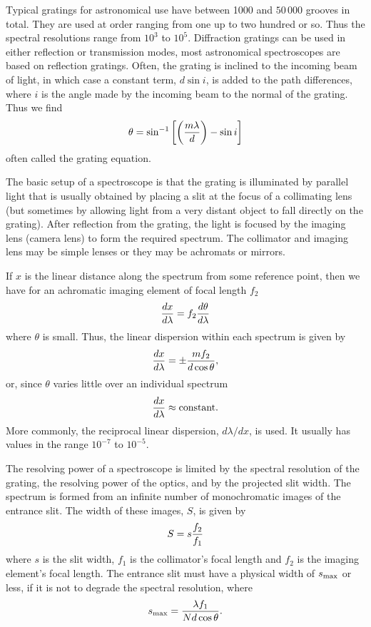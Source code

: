 Typical gratings for astronomical use have between 1000 and $50\,000$ grooves in total.
They are used at order ranging from one up to two hundred or so. Thus the spectral 
resolutions range from $10^3$ to $10^5$. Diffraction gratings can be used in either 
reflection or transmission modes, most astronomical spectroscopes are based on reflection gratings. Often, the grating is inclined to the incoming beam of light, in which
case a constant term, $d\sin i$, is added to the path differences, where $i$ is the angle
made by the incoming beam to the normal of the grating. Thus we find
\[
\theta=\sin^{-1}\left[\left({m\lambda\over d}\right)-\sin i\right]
\]
often called the grating equation.

The basic setup of a spectroscope is that the grating is illuminated by parallel light
that is usually obtained by placing a slit at the focus of a collimating lens (but sometimes by allowing light from a very distant object to fall directly on the grating).
After reflection from the grating, the light is focused by the imaging lens (camera lens)
to form the required spectrum. The collimator and imaging lens may be simple lenses or they may be achromats or mirrors.

If $x$ is the linear distance along the spectrum from some reference point, then we have
for an achromatic imaging element of focal length $f_2$
\[
{dx\over d\lambda}=f_2{d\theta\over d\lambda}
\]
where $\theta$ is small. Thus, the linear dispersion within each spectrum is given by
\[
{dx\over d\lambda}=\pm{mf_2\over d\cos\theta},
\]
or, since $\theta$ varies little over an individual spectrum
\[
{dx\over d\lambda}\approx {\rm constant}.
\]
More commonly, the reciprocal linear dispersion, ${d\lambda/dx}$, is used. It usually 
has values in the range $10^{-7}$ to $10^{-5}$.

The resolving power of a spectroscope is limited by the spectral resolution of the grating,
the resolving power of the optics, and by the projected slit width. The spectrum is formed
from an infinite number of monochromatic images of the entrance slit. The width of 
these images, $S$, is given by
\[
S=s{f_2\over f_1}
\]
where $s$ is the slit width, $f_1$ is the collimator's focal length and $f_2$ is the imaging element's focal length. The entrance slit must have a physical width of
$s_{\rm max}$ or less, if it is not to degrade the spectral resolution, where
\[
s_{\rm max}={\lambda f_1\over N d\cos\theta}.
\]

